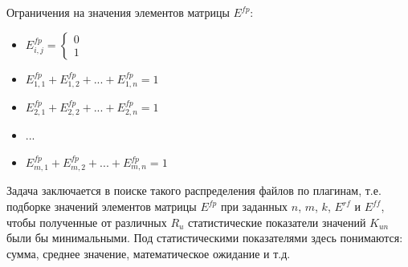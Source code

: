 \documentclass{article}
\begin{document}
  Ограничения на значения элементов матрицы $E^{fp}$:
  \begin{itemize}
    \item[] 
    $
    E^{fp}_{i, j} =
      \begin{cases}
      0 \\
      1
      \end{cases}
    $
    \item[] $E^{fp}_{1, 1} + E^{fp}_{1, 2} + ... + E^{fp}_{1, n} = 1$
    \item[] $E^{fp}_{2, 1} + E^{fp}_{2, 2} + ... + E^{fp}_{2, n} = 1$
    \item[] ...
    \item[] $E^{fp}_{m, 1} + E^{fp}_{m, 2} + ... + E^{fp}_{m, n} = 1$
  \end{itemize}

  
  Задача заключается в поиске такого распределения файлов по плагинам, т.е. подборке значений элементов матрицы $E^{fp}$ при заданных $n$, $m$, $k$, $E^{rf}$ и $E^{ff}$, чтобы полученные от различных $R_{u}$ статистические показатели значений $K_{un}$ были бы минимальными. Под статистическими показателями здесь понимаются: сумма, среднее значение, математическое ожидание и т.д.
\end{document}
